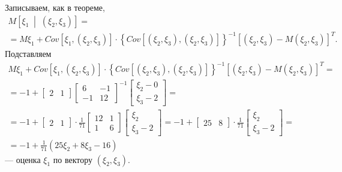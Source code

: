 \begin{enumerate}[label=\alph*)]
  Записываем, как в теореме,
  \begin{equation*}
    \begin{split}
      M \left[ \xi_1 \; \middle| \; \left( \xi_2, \xi_3 \right) \right] = \\
      = M \xi_1 +
      Cov \left[ \xi_1, \left( \xi_2, \xi_3 \right) \right] \cdot
      \left\{
        Cov \left[ \left( \xi_2, \xi_3 \right), \left( \xi_2, \xi_3 \right) \right]
      \right\}^{-1} \left[ \left( \xi_2, \xi_3 \right) - M \left( \xi_2, \xi_3 \right) \right]^T.
    \end{split}
  \end{equation*}
  Подставляем
  \begin{equation*}
    \begin{split}
      M \xi_1 +
      Cov \left[ \xi_1, \left( \xi_2, \xi_3 \right) \right] \cdot
      \left\{
        Cov \left[ \left( \xi_2, \xi_3 \right), \left( \xi_2, \xi_3 \right) \right]
      \right\}^{-1}
      \left[ \left( \xi_2, \xi_3 \right) - M \left( \xi_2, \xi_3 \right) \right]^T = \\
      = -1 +
      \begin{bmatrix}
        2 & 1
      \end{bmatrix}
      \begin{bmatrix}
        6 & -1 \\
        -1 & 12
      \end{bmatrix}^{-1}
      \begin{bmatrix}
        \xi_2 - 0 \\
        \xi_3 - 2
      \end{bmatrix} = \\
      = -1 +
      \begin{bmatrix}
        2 & 1
      \end{bmatrix} \cdot \frac{1}{71}
      \begin{bmatrix}
        12 & 1 \\
        1 & 6
      \end{bmatrix}
      \begin{bmatrix}
        \xi_2 \\
        \xi_3 - 2
      \end{bmatrix} =
      -1 +
      \begin{bmatrix}
        25 & 8
      \end{bmatrix} \cdot \frac{1}{71}
      \begin{bmatrix}
        \xi_2 \\
        \xi_3 - 2
      \end{bmatrix} = \\
      = -1 + \frac{1}{71} \left( 25 \xi_2 + 8 \xi_3 - 16 \right)
    \end{split}
  \end{equation*}
  --- оценка $ \xi_1$ по вектору $ \left( \xi_2, \xi_3 \right)$.


\end{enumerate}
